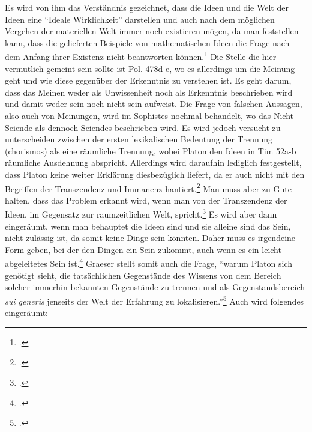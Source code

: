 Es wird von ihm das Verständnis gezeichnet, dass die Ideen und die Welt der Ideen eine \enquote{Ideale Wirklichkeit} darstellen und auch nach dem möglichen Vergehen der materiellen Welt immer noch existieren mögen, da man feststellen kann, dass die gelieferten Beispiele von mathematischen Ideen die Frage nach dem Anfang ihrer Existenz nicht beantworten können.\footcite[vgl.][S. 99]{Hirschberger} 
Die Stelle die hier vermutlich gemeint sein sollte ist Pol. 478d-e, wo es allerdings um die Meinung geht und wie diese gegenüber der Erkenntnis zu verstehen ist. Es geht darum, dass das Meinen weder als Unwissenheit noch als Erkenntnis beschrieben wird und damit weder sein noch nicht-sein aufweist. Die Frage von falschen Aussagen, also auch von Meinungen, wird im Sophistes nochmal behandelt, wo das Nicht-Seiende als dennoch Seiendes beschrieben wird. 
Es wird jedoch versucht zu unterscheiden zwischen der ersten lexikalischen Bedeutung der Trennung (chorismos) als eine räumliche Trennung, wobei Platon den Ideen in Tim 52a-b räumliche Ausdehnung abspricht. Allerdings wird daraufhin lediglich festgestellt, dass Platon keine weiter Erklärung diesbezüglich liefert, da er auch nicht mit den Begriffen der Transzendenz und Immanenz hantiert.\footcite[vgl.][S. 34f]{DisseMetaphysik} Man muss aber zu Gute halten, dass das Problem erkannt wird, wenn man von der Transzendenz der Ideen, im Gegensatz zur raumzeitlichen Welt, spricht.\footcite[vgl.][S. 35]{DisseMetaphysik} 
Es wird aber dann eingeräumt, wenn man behauptet die Ideen sind und sie alleine sind das Sein, nicht zulässig ist, da somit keine Dinge sein könnten. Daher muss es irgendeine Form geben, bei der den Dingen ein Sein zukommt, auch wenn es ein leicht abgeleitetes Sein ist.\footcite[vgl.][S. 131]{Martin73}
Graeser stellt somit auch die Frage, \enquote{warum Platon sich genötigt sieht, die tatsächlichen Gegenstände des Wissens von dem Bereich solcher immerhin bekannten Gegenstände zu trennen und als Gegenstandsbereich \emph{sui generis} jenseits der Welt der Erfahrung zu lokalisieren.}\footcite[][S. 135]{GraeserPhiloGeschichte}
Auch wird folgendes eingeräumt: 
